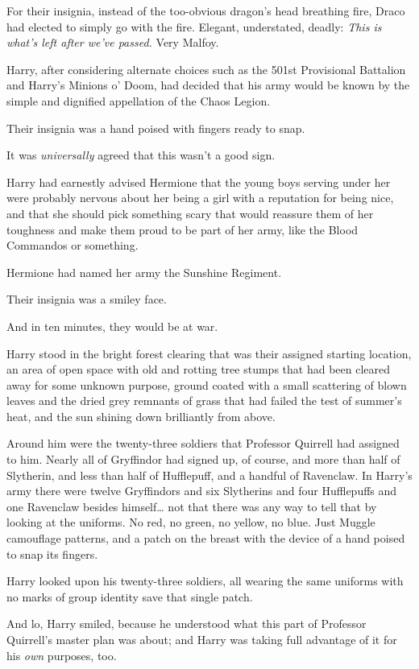 For their insignia, instead of the too-obvious dragon's head breathing fire, Draco had elected to simply go with the fire. Elegant, understated, deadly: \emph{This is what's left after we've passed.} Very Malfoy.

Harry, after considering alternate choices such as the 501st Provisional Battalion and Harry's Minions o' Doom, had decided that his army would be known by the simple and dignified appellation of the Chaos Legion.

Their insignia was a hand poised with fingers ready to snap.

It was \emph{universally} agreed that this wasn't a good sign.

Harry had earnestly advised Hermione that the young boys serving under her were probably nervous about her being a girl with a reputation for being nice, and that she should pick something scary that would reassure them of her toughness and make them proud to be part of her army, like the Blood Commandos or something.

Hermione had named her army the Sunshine Regiment.

Their insignia was a smiley face.

And in ten minutes, they would be at war.

Harry stood in the bright forest clearing that was their assigned starting location, an area of open space with old and rotting tree stumps that had been cleared away for some unknown purpose, ground coated with a small scattering of blown leaves and the dried grey remnants of grass that had failed the test of summer's heat, and the sun shining down brilliantly from above.

Around him were the twenty-three soldiers that Professor Quirrell had assigned to him. Nearly all of Gryffindor had signed up, of course, and more than half of Slytherin, and less than half of Hufflepuff, and a handful of Ravenclaw. In Harry's army there were twelve Gryffindors and six Slytherins and four Hufflepuffs and one Ravenclaw besides himself{\ldots} not that there was any way to tell that by looking at the uniforms. No red, no green, no yellow, no blue. Just Muggle camouflage patterns, and a patch on the breast with the device of a hand poised to snap its fingers.

Harry looked upon his twenty-three soldiers, all wearing the same uniforms with no marks of group identity save that single patch.

And lo, Harry smiled, because he understood what this part of Professor Quirrell's master plan was about; and Harry was taking full advantage of it for his \emph{own} purposes, too.

